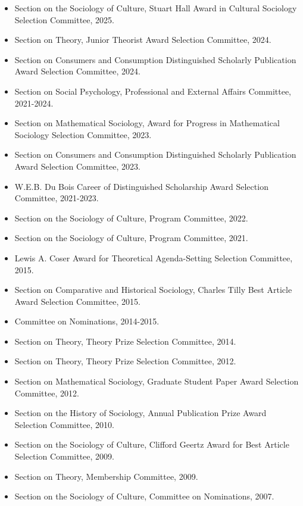 \documentclass[
]{article}
\providecommand{\tightlist}{%
  \setlength{\itemsep}{0pt}\setlength{\parskip}{0pt}}
\begin{document}
\begin{itemize}
\tightlist
\item
  Section on the Sociology of Culture, Stuart Hall Award in Cultural
  Sociology Selection Committee, 2025.
\item
  Section on Theory, Junior Theorist Award Selection Committee, 2024.
\item
  Section on Consumers and Consumption Distinguished Scholarly
  Publication Award Selection Committee, 2024.
\item
  Section on Social Psychology, Professional and External Affairs
  Committee, 2021-2024.
\item
  Section on Mathematical Sociology, Award for Progress in Mathematical
  Sociology Selection Committee, 2023.
\item
  Section on Consumers and Consumption Distinguished Scholarly
  Publication Award Selection Committee, 2023.
\item
  W.E.B. Du Bois Career of Distinguished Scholarship Award Selection
  Committee, 2021-2023.
\item
  Section on the Sociology of Culture, Program Committee, 2022.
\item
  Section on the Sociology of Culture, Program Committee, 2021.
\item
  Lewis A. Coser Award for Theoretical Agenda-Setting Selection
  Committee, 2015.
\item
  Section on Comparative and Historical Sociology, Charles Tilly Best
  Article Award Selection Committee, 2015.
\item
  Committee on Nominations, 2014-2015.
\item
  Section on Theory, Theory Prize Selection Committee, 2014.
\item
  Section on Theory, Theory Prize Selection Committee, 2012.
\item
  Section on Mathematical Sociology, Graduate Student Paper Award
  Selection Committee, 2012.
\item
  Section on the History of Sociology, Annual Publication Prize Award
  Selection Committee, 2010.
\item
  Section on the Sociology of Culture, Clifford Geertz Award for Best
  Article Selection Committee, 2009.
\item
  Section on Theory, Membership Committee, 2009.
\item
  Section on the Sociology of Culture, Committee on Nominations, 2007.
\end{itemize}
\end{document}
